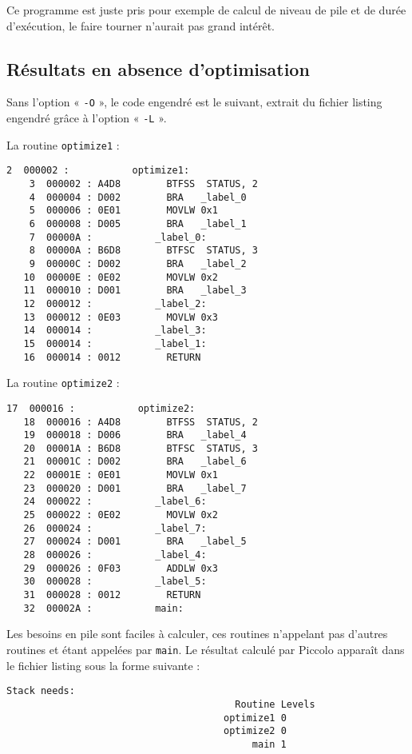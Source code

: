 Ce programme est juste pris pour exemple de calcul de niveau de pile et de durée d'exécution, le faire tourner n'aurait pas grand intérêt.

\subsection{Résultats en absence d'optimisation}

Sans l'option « \texttt{-O} », le code engendré est le suivant, extrait du fichier listing engendré grâce à l'option « \texttt{-L} ».

La routine \texttt{optimize1} :

\begin{lstlisting}[language=assembleur, frame=l]
    2  000002 :           optimize1:
    3  000002 : A4D8        BTFSS  STATUS, 2
    4  000004 : D002        BRA   _label_0
    5  000006 : 0E01        MOVLW 0x1
    6  000008 : D005        BRA   _label_1
    7  00000A :           _label_0:
    8  00000A : B6D8        BTFSC  STATUS, 3
    9  00000C : D002        BRA   _label_2
   10  00000E : 0E02        MOVLW 0x2
   11  000010 : D001        BRA   _label_3
   12  000012 :           _label_2:
   13  000012 : 0E03        MOVLW 0x3
   14  000014 :           _label_3:
   15  000014 :           _label_1:
   16  000014 : 0012        RETURN
\end{lstlisting}

La routine \texttt{optimize2} :

\begin{lstlisting}[language=assembleur, frame=l]
   17  000016 :           optimize2:
   18  000016 : A4D8        BTFSS  STATUS, 2
   19  000018 : D006        BRA   _label_4
   20  00001A : B6D8        BTFSC  STATUS, 3
   21  00001C : D002        BRA   _label_6
   22  00001E : 0E01        MOVLW 0x1
   23  000020 : D001        BRA   _label_7
   24  000022 :           _label_6:
   25  000022 : 0E02        MOVLW 0x2
   26  000024 :           _label_7:
   27  000024 : D001        BRA   _label_5
   28  000026 :           _label_4:
   29  000026 : 0F03        ADDLW 0x3
   30  000028 :           _label_5:
   31  000028 : 0012        RETURN
   32  00002A :           main:
\end{lstlisting}

Les besoins en pile sont faciles à calculer, ces routines n'appelant pas d'autres routines et étant appelées par \texttt{main}. Le résultat calculé par Piccolo apparaît dans le fichier listing sous la forme suivante :
\begin{lstlisting}[language=assembleur, frame=l]
Stack needs:
                                        Routine Levels
                                      optimize1 0
                                      optimize2 0
                                           main 1
\end{lstlisting}


